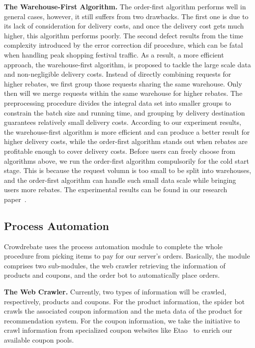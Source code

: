\textbf{The Warehouse-First Algorithm.} The order-first algorithm performs well in general cases,  however, it still suffers from two drawbacks. The first one is due to its lack of consideration for delivery costs, and once the delivery cost gets much higher, this algorithm performs poorly. The second defect results from the time complexity introduced by the error correction dif procedure, which can be fatal when handling peak shopping festival traffic. As a result, a more efficient approach, the warehouse-first algorithm, is proposed to tackle the large scale data and non-negligible delivery costs. Instead of directly combining requests for higher rebates, we first group those requests sharing the same warehouse. Only then will we merge requests within the same warehouse for higher rebates. The preprocessing procedure divides the integral data set into smaller groups to constrain the batch size and running time, and grouping by delivery destination guarantees relatively small delivery costs. According to our experiment results, the warehouse-first algorithm is more efficient and can produce a better result for higher delivery costs, while the order-first algorithm stands out when rebates are profitable enough to cover delivery costs. Before users can freely choose from algorithms above, we run the order-first algorithm compulsorily for the cold start stage. This is because the request volumn is too small to be split into warehouses, and the order-first algorithm can handle such small data scale while bringing users more rebates. The experimental results can be found in our research paper~\cite{Report}.
\subsection{Process Automation}

Crowdrebate uses the process automation module to complete the whole procedure from picking items to pay for our server's orders. Basically, the module comprises two sub-modules, the web crawler retrieving the information of products and coupons, and the order bot to automatically place orders. 

\textbf{The Web Crawler.} Currently, two types of information will be crawled, respectively, products and coupons. For the product information, the spider bot crawls the associated coupon information and the meta data of the product for recommendation system. For the coupon information, we take the initiative to crawl information from specialized coupon websites like Etao~\cite{etao} to enrich our available coupon pools. 

